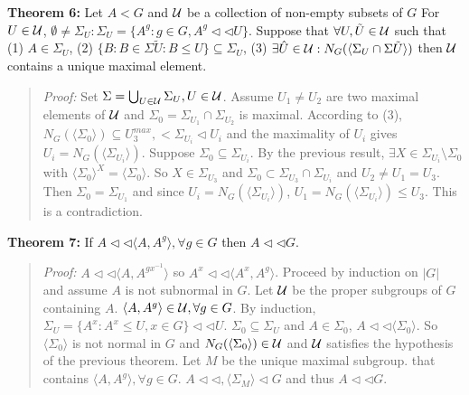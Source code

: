 {\bf Theorem 6:}
Let $A < G$ and ${\cal U}$ be a collection of non-empty subsets of $G$
For $U \in {\cal U}$, $\emptyset \ne 
\Sigma_U:
\Sigma_U = \{ A^g : g \in G, A^g \lhd \lhd U \}$.  Suppose that $\forall U, \tilde{U} \in {\cal U}$
such that (1) $A \in \Sigma_U$, 
(2) $\{ B: B \in \Sigma{\tilde{U}} : B \le U \} \subseteq \Sigma_U$,
(3) $\exists \hat{U} \in {\cal U}: N_G( \langle \Sigma_U \cap \Sigma{\tilde{U}} \rangle)$
then ${\cal U}$ contains a unique maximal element.
\begin{quote}
\emph{Proof:}
Set $\Sigma= \bigcup_{U \in {\cal U}} \Sigma_U, U \in {\cal U}$.  Assume $U_1 \ne U_2$
are two maximal elements of ${\cal U}$ and $\Sigma_0 = \Sigma_{U_1} \cap \Sigma_{U_2}$
is maximal.  According to (3), 
$N_G( \langle \Sigma_0 \rangle) \subseteq U_3^{max}, <\Sigma_{U_i} \lhd U_i$
and the maximality of $U_i$ gives $U_i= N_G( \langle \Sigma_{U_i} \rangle)$.
Suppose $\Sigma_0 \subseteq \Sigma_{U_i}$.  By the previous result, 
$\exists X \in \Sigma_{U_i} \setminus \Sigma_0$ 
with $ \langle \Sigma_0 \rangle^X = \langle \Sigma_0 \rangle $.  So
$X \in \Sigma_{U_3}$ and $\Sigma_0 \subset \Sigma_{U_3} \cap \Sigma_{U_i}$ and
$U_2 \ne U_1 = U_3$.  Then $\Sigma_0 = \Sigma_{U_1}$ and since
$U_i= N_G( \langle \Sigma_{U_i} \rangle)$,
$U_1= N_G( \langle \Sigma_{U_i} \rangle) \le U_3$.  This is a contradiction.
\end{quote}
{\bf Theorem 7:}
If $A \lhd \lhd \langle A,A^g \rangle , \forall g \in G$ then $A \lhd \lhd G$.
\begin{quote}
\emph{Proof:}
$A \lhd \lhd \langle A , A^{gx^{-1}} \rangle $ so
$A^x \lhd \lhd \langle A^x , A^{g} \rangle $.  
Proceed by induction on $|G|$ and assume $A$ is not
subnormal in $G$.  Let ${\cal U}$ be the proper subgroups of $G$ containing $A$.
$ \langle A, A^g \rangle \in {\cal U}, \forall g \in G$.  By induction,
$\Sigma_U= \{ A^x: A^x \le U, x \in G \} \lhd \lhd U$.  $\Sigma_0 \subseteq \Sigma_U$
and $A \in \Sigma_0$, $A \lhd \lhd \langle \Sigma_0 \rangle $.  So
$ \langle \Sigma_0 \rangle $ is not normal in $G$ and 
$N_G( \langle \Sigma_0 \rangle) \in {\cal U}$ and ${\cal U}$
satisfies the hypothesis of the previous theorem.  Let $M$ be the unique maximal subgroup.
that contains 
$ \langle A, A^g \rangle , \forall g \in G$.  $A \lhd \lhd , \langle \Sigma_M \rangle \lhd G$ and
thus $A \lhd \lhd G$.
\end{quote}
